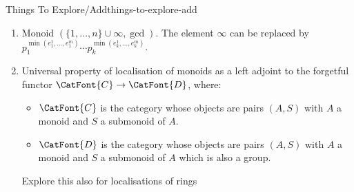 \begin{remark}{Things To Explore/Add}{things-to-explore-add}
\begin{enumerate}
        \item Monoid $(\{1,\ldots,n\}\cup\infty,\gcd)$. The element $\infty$ can be replaced by $p^{\min(e^{1}_{1},\ldots,e^{m}_{1})}_{1}\cdots p^{\min(e^{1}_{k},\ldots,e^{m}_{k})}_{k}$.
        \item Universal property of localisation of monoids as a left adjoint to the forgetful functor $\CatFont{C}\to\CatFont{D}$, where:
            \begin{itemize}
                \item $\CatFont{C}$ is the category whose objects are pairs $(A,S)$ with $A$ a monoid and $S$ a submonoid of $A$.
                \item $\CatFont{D}$ is the category whose objects are pairs $(A,S)$ with $A$ a monoid and $S$ a submonoid of $A$ which is also a group.
            \end{itemize}
            Explore this also for localisations of rings


\end{enumerate}
\end{remark}
